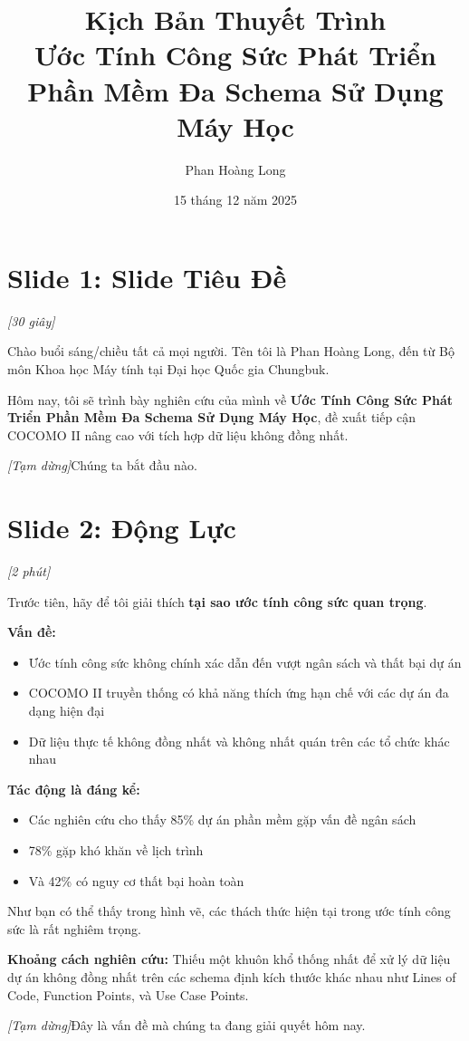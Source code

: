 \documentclass[12pt,a4paper]{article}
\title{\textbf{Kịch Bản Thuyết Trình} \\ Ước Tính Công Sức Phát Triển Phần Mềm Đa Schema Sử Dụng Máy Học}
\author{Phan Hoàng Long}
\date{15 tháng 12 năm 2025}
\newcommand{\slide}[1]{\section*{\textcolor{slidenum}{Slide #1}}}
\newcommand{\timing}[1]{\textcolor{timing}{\textit{[#1]}}}
\newcommand{\keypoint}[1]{\textcolor{keypoint}{\textbf{#1}}}
\newcommand{\pause}{\textit{[Tạm dừng]}}
\begin{document}
\maketitle
\tableofcontents
\newpage

\slide{1: Slide Tiêu Đề}
\timing{30 giây}

Chào buổi sáng/chiều tất cả mọi người. Tên tôi là Phan Hoàng Long, đến từ Bộ môn Khoa học Máy tính tại Đại học Quốc gia Chungbuk.

Hôm nay, tôi sẽ trình bày nghiên cứu của mình về \keypoint{Ước Tính Công Sức Phát Triển Phần Mềm Đa Schema Sử Dụng Máy Học}, đề xuất tiếp cận COCOMO II nâng cao với tích hợp dữ liệu không đồng nhất.

\pause Chúng ta bắt đầu nào.

\slide{2: Động Lực}
\timing{2 phút}

Trước tiên, hãy để tôi giải thích \keypoint{tại sao ước tính công sức quan trọng}.

\textbf{Vấn đề:}
\begin{itemize}
    \item Ước tính công sức không chính xác dẫn đến vượt ngân sách và thất bại dự án
    \item COCOMO II truyền thống có khả năng thích ứng hạn chế với các dự án đa dạng hiện đại
    \item Dữ liệu thực tế không đồng nhất và không nhất quán trên các tổ chức khác nhau
\end{itemize}

\textbf{Tác động là đáng kể:}
\begin{itemize}
    \item Các nghiên cứu cho thấy 85\% dự án phần mềm gặp vấn đề ngân sách
    \item 78\% gặp khó khăn về lịch trình
    \item Và 42\% có nguy cơ thất bại hoàn toàn
\end{itemize}

Như bạn có thể thấy trong hình vẽ, các thách thức hiện tại trong ước tính công sức là rất nghiêm trọng.

\textbf{Khoảng cách nghiên cứu:} Thiếu một khuôn khổ thống nhất để xử lý dữ liệu dự án không đồng nhất trên các schema định kích thước khác nhau như Lines of Code, Function Points, và Use Case Points.

\pause Đây là vấn đề mà chúng ta đang giải quyết hôm nay.
\end{document}
